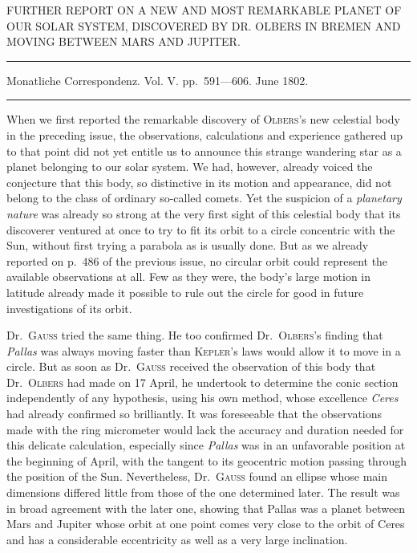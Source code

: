 %
\bigskip{}
\begin{center}
{\small FURTHER REPORT ON A NEW AND MOST REMARKABLE PLANET OF OUR SOLAR SYSTEM, DISCOVERED BY DR. OLBERS IN BREMEN AND MOVING BETWEEN MARS AND JUPITER.\par}
\medskip\hrule\medskip
Monatliche Correspondenz. Vol. V. pp.\ 591—606. June 1802.\par
\medskip\hrule
\end{center}\medskip
When we first reported the remarkable discovery of \textsc{Olbers}'s new celestial body in the preceding issue, the observations, calculations and experience gathered up to that point did not yet entitle us to announce this strange wandering star as a planet belonging to our solar system. We had, however, already voiced the conjecture that this body, so distinctive in its motion and appearance, did not belong to the class of ordinary so-called comets. Yet the suspicion of a \textit{planetary nature} was already so strong at the very first sight of this celestial body that its discoverer ventured at once to try to fit its orbit to a circle concentric with the Sun, without first trying a parabola as is usually done. But as we already reported on p.\ 486 of the previous issue, no circular orbit could represent the available observations at all. Few as they were, the body's large motion in latitude already made it possible to rule out the circle for good in future investigations of its orbit.

Dr.\ \textsc{Gauss} tried the same thing. He too confirmed Dr.\ \textsc{Olbers}'s finding that \textit{Pallas} was always moving faster than \textsc{Kepler}'s laws would allow it to move in a circle. But as soon as Dr.\ \textsc{Gauss} received the observation of this body that Dr.\ \textsc{Olbers} had made on 17 April, he undertook to determine the conic section independently of any hypothesis, using his own method, whose excellence \textit{Ceres} had already confirmed so brilliantly. It was foreseeable that the observations made with the ring micrometer would lack the accuracy and duration needed for this delicate calculation, especially since \textit{Pallas} was in an unfavorable position at the beginning of April, with the tangent to its geocentric motion passing through the position of the Sun. Nevertheless, Dr.\ \textsc{Gauss} found an ellipse whose main dimensions differed little from those of the one determined later. The result was in broad agreement with the later one, showing that Pallas was a planet between Mars and Jupiter whose orbit at one point comes very close to the orbit of Ceres and has a considerable eccentricity as well as a very large inclination.

